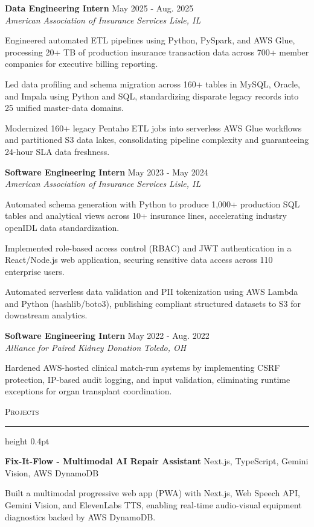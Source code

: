 \documentclass[letterpaper,11pt]{article}
\newcommand{\resumesection}[1]{%
  \par\vspace{2pt}%
  {\large\scshape #1}\par\vspace{2pt}%
  \hrule height 0.4pt\vspace{2pt}%
}
\newcommand{\resumeSubheading}[4]{
  \textbf{#1} \hfill #2\\
  \textit{#3} \hfill \textit{#4}
}
\newcommand{\projectHeading}[2]{
  \textbf{#1} \hfill #2
}
\begin{document}
\resumeSubheading
{Data Engineering Intern}{May 2025 - Aug. 2025}
{American Association of Insurance Services}{Lisle, IL}
\begin{tightitemize}
  \item Engineered automated ETL pipelines using Python, PySpark, and AWS Glue, processing 20+ TB of production insurance transaction data across 700+ member companies for executive billing reporting.
  \item Led data profiling and schema migration across 160+ tables in MySQL, Oracle, and Impala using Python and SQL, standardizing disparate legacy records into 25 unified master-data domains.
  \item Modernized 160+ legacy Pentaho ETL jobs into serverless AWS Glue workflows and partitioned S3 data lakes, consolidating pipeline complexity and guaranteeing 24-hour SLA data freshness.
\end{tightitemize}

\resumeSubheading
{Software Engineering Intern}{May 2023 - May 2024}
{American Association of Insurance Services}{Lisle, IL}
\begin{tightitemize}
  \item Automated schema generation with Python to produce 1,000+ production SQL tables and analytical views across 10+ insurance lines, accelerating industry openIDL data standardization.
  \item Implemented role-based access control (RBAC) and JWT authentication in a React/Node.js web application, securing sensitive data access across 110 enterprise users.
  \item Automated serverless data validation and PII tokenization using AWS Lambda and Python (hashlib/boto3), publishing compliant structured datasets to S3 for downstream analytics.
\end{tightitemize}

\resumeSubheading
{Software Engineering Intern}{May 2022 - Aug. 2022}
{Alliance for Paired Kidney Donation}{Toledo, OH}
\begin{tightitemize}
  \item Hardened AWS-hosted clinical match-run systems by implementing CSRF protection, IP-based audit logging, and input validation, eliminating runtime exceptions for organ transplant coordination.
\end{tightitemize}

\resumesection{Projects}
\projectHeading{Fix-It-Flow - Multimodal AI Repair Assistant}{Next.js, TypeScript, Gemini Vision, AWS DynamoDB}
\begin{tightitemize}
  \item Built a multimodal progressive web app (PWA) with Next.js, Web Speech API, Gemini Vision, and ElevenLabs TTS, enabling real-time audio-visual equipment diagnostics backed by AWS DynamoDB.
\end{tightitemize}
\end{document}
